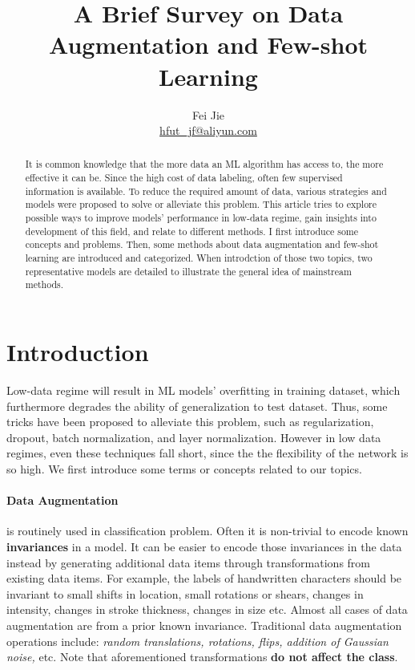 \documentclass{article}
\title{A Brief Survey on Data Augmentation and Few-shot Learning}
\author{Fei Jie \\ \href{mailto:hfut\_jf@aliyun.com}{hfut\_jf@aliyun.com}}
\begin{document}
\maketitle
\thispagestyle{firstpage}

\begin{abstract}
It is common knowledge that the more data an ML algorithm has access to, the more effective it can be. Since the high cost of data labeling, often few supervised information is available. To reduce the required amount of data, various strategies and models were proposed to solve or alleviate this problem. This article tries to explore possible ways to improve models' performance in low-data regime, gain insights into development of this field, and relate to different methods. I first introduce some concepts and problems. Then, some methods about data augmentation and few-shot learning are introduced and categorized. When introdction of those two topics, two representative models are detailed to illustrate the general idea of mainstream methods. 
\end{abstract}

\section{Introduction}

Low-data regime will result in ML models' overfitting in training dataset, which furthermore degrades the ability of generalization to test dataset. Thus, some tricks have been proposed to alleviate this problem, such as regularization, dropout\cite{hinton2012improving}, batch normalization\cite{ioffe2015batch}, and layer normalization\cite{ba2016layer}. However in low data regimes, even these techniques fall short, since the the flexibility of the network is so high. We first introduce some terms or concepts related to our topics.

\paragraph{Data Augmentation} \cite{krizhevsky2012imagenet} is routinely used in classification problem. Often it is non-trivial to encode known \textbf{invariances} in a model. It can be easier to encode those invariances in the data instead by generating additional data items through transformations from existing data items. For example, the labels of handwritten characters should be invariant to small shifts in location, small rotations or shears, changes in intensity, changes in stroke thickness, changes in size etc. Almost all cases of data augmentation are from a prior known invariance. Traditional data augmentation operations include: \textit{random translations, rotations, flips, addition of Gaussian noise,} etc. Note that aforementioned transformations \textbf{do not affect the class}.
\end{document}
